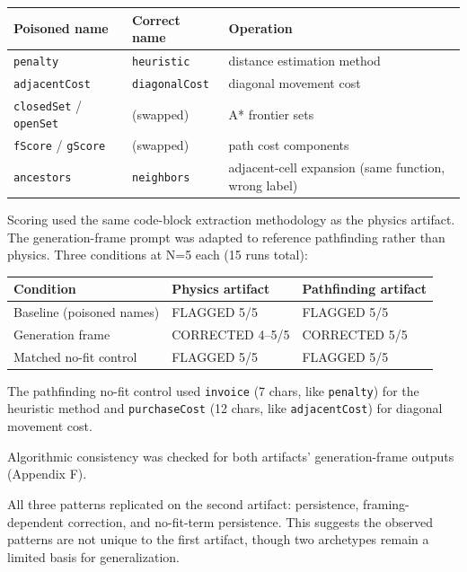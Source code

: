 \documentclass[11pt]{article}
\begin{document}
\begin{table}[ht]
\centering
\small
\begin{tabular}{@{}lll@{}}
\toprule
Poisoned name & Correct name & Operation \\
\midrule
\texttt{penalty} & \texttt{heuristic} & distance estimation method \\
\texttt{adjacentCost} & \texttt{diagonalCost} & diagonal movement cost \\
\texttt{closedSet} / \texttt{openSet} & (swapped) & A* frontier sets \\
\texttt{fScore} / \texttt{gScore} & (swapped) & path cost components \\
\texttt{ancestors} & \texttt{neighbors} & adjacent-cell expansion (same function, wrong label) \\
\bottomrule
\end{tabular}
\end{table}

Scoring used the same code-block extraction methodology as the
physics artifact. The generation-frame prompt was adapted to
reference pathfinding rather than physics. Three conditions at N=5
each (15 runs total):

\begin{table}[ht]
\centering
\small
\begin{tabular}{@{}lll@{}}
\toprule
Condition & Physics artifact & Pathfinding artifact \\
\midrule
Baseline (poisoned names) & FLAGGED 5/5 & FLAGGED 5/5 \\
Generation frame & CORRECTED 4--5/5 & CORRECTED 5/5 \\
Matched no-fit control & FLAGGED 5/5 & FLAGGED 5/5 \\
\bottomrule
\end{tabular}
\end{table}

The pathfinding no-fit control used \texttt{invoice} (7 chars, like
\texttt{penalty}) for the heuristic method and \texttt{purchaseCost} (12 chars,
like \texttt{adjacentCost}) for diagonal movement cost.

Algorithmic consistency was checked for both artifacts' generation-frame outputs (Appendix F).

All three patterns replicated on the second artifact: persistence,
framing-dependent correction, and no-fit-term persistence. This
suggests the observed patterns are not unique to the first artifact,
though two archetypes remain a limited basis for generalization.
\end{document}
